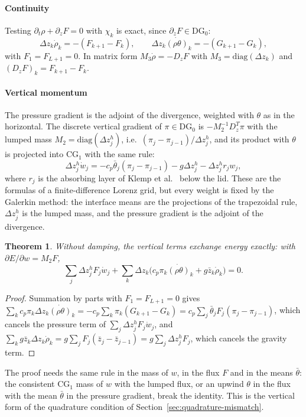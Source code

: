 \documentclass[preprint,12pt]{elsarticle}
\newtheorem{theorem}{Theorem}
\theoremstyle{definition}
\begin{document}
\paragraph{Continuity} Testing $\partial_t\rho + \partial_zF = 0$ with $\chi_k$ is exact, since
$\partial_zF\in\mathrm{DG}_0$:
\[
  \Delta z_k\dot\rho_k = -(F_{k+1} - F_k),\qquad \Delta z_k\dot{(\rho\theta)}_k = -(G_{k+1} - G_k),
\]
with $F_1 = F_{L+1} = 0$. In matrix form $M_3\dot\rho = -D_zF$ with $M_3 = \mathrm{diag}(\Delta z_k)$ and
$(D_zF)_k = F_{k+1} - F_k$.

\paragraph{Vertical momentum} The pressure gradient is the adjoint of the divergence, weighted with $\theta$
as in the horizontal. The discrete vertical gradient of $\pi\in\mathrm{DG}_0$ is
$-M_2^{-1}D_z^T\pi$ with the lumped mass $M_2 = \mathrm{diag}(\Delta z^h_j)$, i.e.\
$(\pi_j - \pi_{j-1})/\Delta z^h_j$, and its product with $\theta$ is projected into $\mathrm{CG}_1$ with the
same rule:
\[
  \Delta z^h_j\dot w_j = -c_p\bar\theta_j(\pi_j - \pi_{j-1}) - g\Delta z^h_j - \Delta z^h_jr_jw_j ,
\]
where $r_j$ is the absorbing layer of Klemp et al.\ \cite{Klemp2008} below the lid. These are the formulas
of a finite-difference Lorenz grid, but every weight is fixed by the Galerkin method: the interface means are
the projections of the trapezoidal rule, $\Delta z^h_j$ is the lumped mass, and the pressure gradient is the
adjoint of the divergence.

\begin{theorem}\label{thm:vertical-energy}
Without damping, the vertical terms exchange energy exactly: with $\partial E/\partial w = M_2F$,
\[
  \sum_j\Delta z^h_jF_j\dot w_j + \sum_k\Delta z_k\bigl(c_p\pi_k\dot{(\rho\theta)}_k + g\bar z_k\dot\rho_k\bigr) = 0 .
\]
\end{theorem}
\begin{proof}
Summation by parts with $F_1 = F_{L+1} = 0$ gives
$\sum_k c_p\pi_k\Delta z_k\dot{(\rho\theta)}_k = -c_p\sum_k\pi_k(G_{k+1}-G_k) = c_p\sum_j\bar\theta_jF_j(\pi_j-\pi_{j-1})$,
which cancels the pressure term of $\sum_j\Delta z^h_jF_j\dot w_j$, and
$\sum_kg\bar z_k\Delta z_k\dot\rho_k = g\sum_jF_j(\bar z_j - \bar z_{j-1}) = g\sum_j\Delta z^h_jF_j$, which cancels
the gravity term.
\end{proof}
The proof needs the same rule in the mass of $w$, in the flux $F$ and in the means $\bar\theta$: the
consistent $\mathrm{CG}_1$ mass of $w$ with the lumped flux, or an upwind $\theta$ in the flux with the mean
$\bar\theta$ in the pressure gradient, break the identity. This is the vertical form of the quadrature
condition of Section~\ref{sec:quadrature-mismatch}.
\end{document}
